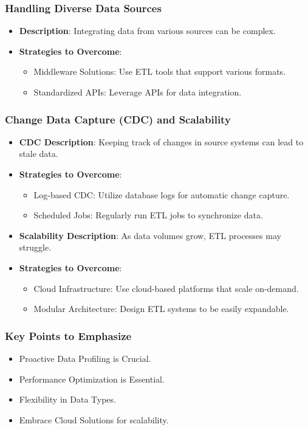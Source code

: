 \documentclass[aspectratio=169]{beamer}
\begin{document}
\begin{frame}
    \frametitle{Handling Diverse Data Sources}
    \begin{itemize}
        \item \textbf{Description}: Integrating data from various sources can be complex.
        \item \textbf{Strategies to Overcome}:
        \begin{itemize}
            \item Middleware Solutions: Use ETL tools that support various formats.
            \item Standardized APIs: Leverage APIs for data integration.
        \end{itemize}
    \end{itemize}
\end{frame}

\begin{frame}
    \frametitle{Change Data Capture (CDC) and Scalability}
    \begin{itemize}
        \item \textbf{CDC Description}: Keeping track of changes in source systems can lead to stale data.
        \item \textbf{Strategies to Overcome}:
        \begin{itemize}
            \item Log-based CDC: Utilize database logs for automatic change capture.
            \item Scheduled Jobs: Regularly run ETL jobs to synchronize data.
        \end{itemize}
        \item \textbf{Scalability Description}: As data volumes grow, ETL processes may struggle.
        \item \textbf{Strategies to Overcome}:
        \begin{itemize}
            \item Cloud Infrastructure: Use cloud-based platforms that scale on-demand.
            \item Modular Architecture: Design ETL systems to be easily expandable.
        \end{itemize}
    \end{itemize}
\end{frame}

\begin{frame}
    \frametitle{Key Points to Emphasize}
    \begin{itemize}
        \item Proactive Data Profiling is Crucial.
        \item Performance Optimization is Essential.
        \item Flexibility in Data Types.
        \item Embrace Cloud Solutions for scalability.
    \end{itemize}
\end{frame}
\end{document}
